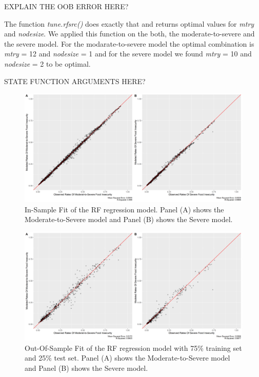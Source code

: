 \documentclass{article}
\begin{document}
EXPLAIN THE OOB ERROR HERE?

The function \textit{tune.rfsrc()} does exactly that and returns optimal values for \textit{mtry} and \textit{nodesize}. We applied this function on the both, the moderate-to-severe and the severe model. For the modarate-to-severe model the optimal combination is \textit{mtry} = 12 and \textit{nodesize} = 1 and for the severe model we found \textit{mtry} = 10 and \textit{nodesize} = 2 to be optimal.

STATE FUNCTION ARGUMENTS HERE?



\begin{figure}[H]
  \centering
  \includegraphics[width=\linewidth]{img/model/in-sample_rf.png}
  \caption{In-Sample Fit of the RF regression model. Panel (A) shows the Moderate-to-Severe model and Panel (B) shows the Severe model.}
  \label{fig:rf_in-sample}
\end{figure}

\begin{figure}[H]
  \centering
  \includegraphics[width=\linewidth]{img/model/out-sample_rf.png}
  \caption{Out-Of-Sample Fit of the RF regression model with 75\% training set and 25\% test set. Panel (A) shows the Moderate-to-Severe model and Panel (B) shows the Severe model.}
  \label{fig:rf_out-sample}
\end{figure}
\end{document}
